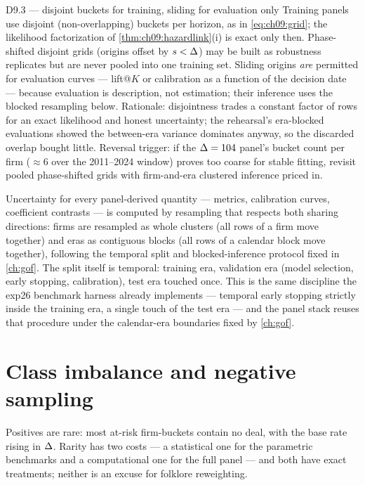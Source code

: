 \begin{decision}{D9.3 --- disjoint buckets for training, sliding for
evaluation only}
Training panels use disjoint (non-overlapping) buckets per horizon, as
in \cref{eq:ch09:grid}; the likelihood factorization of
\cref{thm:ch09:hazardlink}(i) is exact only then. Phase-shifted disjoint
grids (origins offset by $s < \Delta$) may be built as robustness
replicates but are never pooled into one training set. Sliding origins
\emph{are} permitted for evaluation curves --- lift@$K$ or calibration
as a function of the decision date --- because evaluation is
description, not estimation; their inference uses the blocked resampling
below. Rationale: disjointness trades a constant factor of rows for an
exact likelihood and honest uncertainty; the rehearsal's era-blocked
evaluations showed the between-era variance dominates anyway, so the
discarded overlap bought little. Reversal trigger: if the $\Delta=104$
panel's bucket count per firm ($\approx 6$ over the 2011--2024 window)
proves too coarse for stable fitting, revisit pooled phase-shifted grids
with firm-and-era clustered inference priced in.
\end{decision}

Uncertainty for every panel-derived quantity --- metrics, calibration
curves, coefficient contrasts --- is computed by resampling that
respects both sharing directions: firms are resampled as whole clusters
(all rows of a firm move together) and eras as contiguous blocks (all
rows of a calendar block move together), following the temporal split
and blocked-inference protocol fixed in \cref{ch:gof}. The split itself
is temporal: training era, validation era (model selection, early
stopping, calibration), test era touched once. This is the same
discipline the exp26 benchmark harness already implements ---
temporal early stopping strictly inside the training era, a single
touch of the test era --- and the panel stack reuses that procedure
under the calendar-era boundaries fixed by \cref{ch:gof}.

\section{Class imbalance and negative sampling}\label{ch09:sec:sampling}

Positives are rare: most at-risk firm-buckets contain no deal, with the
base rate rising in $\Delta$. Rarity has two costs --- a statistical
one for the parametric benchmarks and a computational one for the full
panel --- and both have exact treatments; neither is an excuse for
folklore reweighting.

